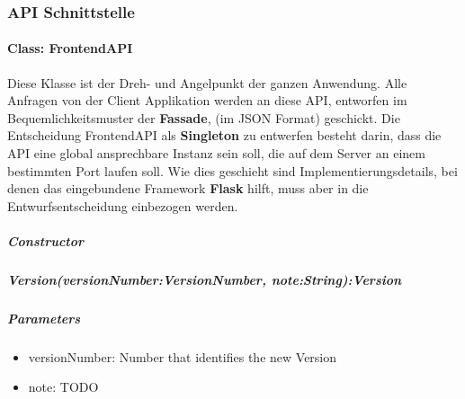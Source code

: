 \subsubsection{API Schnittstelle}
\paragraph{Class: FrontendAPI}
Diese Klasse ist der Dreh- und Angelpunkt der ganzen Anwendung. Alle Anfragen von der Client Applikation werden an diese API, 
entworfen im Bequemlichkeitsmuster der \textbf{Fassade}, (im JSON Format) geschickt. Die Entscheidung FrontendAPI als 
\textbf{Singleton} zu entwerfen besteht darin, dass die API eine global ansprechbare Instanz sein soll, die auf dem Server an 
einem bestimmten Port laufen soll. Wie dies geschieht sind Implementierungsdetails, bei denen das eingebundene Framework 
\textbf{Flask} hilft, muss aber in die Entwurfsentscheidung einbezogen werden.
\subparagraph{Constructor}

\subparagraph{Version(versionNumber:VersionNumber, note:String):Version}

\subparagraph{Parameters}
\begin{itemize}
	\item{versionNumber:}
	Number that identifies the new Version
	\item{note:}
	TODO
\end{itemize}
